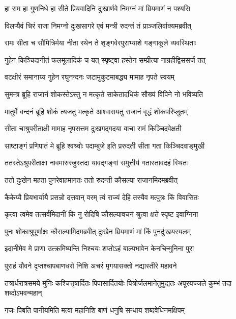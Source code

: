 \twolineshloka
{हा राम हा गुणनिधे हा सीते प्रियवादिनि}
{दुःखार्णवे निमग्नं मां म्रियमाणं न पश्यसि} %

\twolineshloka
{विलप्यैवं चिरं राजा निमग्नो दुःखसागरे}
{एवं मन्त्री रुदन्तं तं प्राञ्जलिर्वाक्यमब्रवीत्} %

\twolineshloka
{रामः सीता च सौमित्रिर्मया नीता रथेन ते}
{शृङ्गवेरपुराभ्याशे गङ्गाकूले व्यवस्थिताः} %

\twolineshloka
{गुहेन किञ्चिदानीतं फलमूलादिकं च यत्}
{स्पृष्ट्वा हस्तेन सम्प्रीत्या नाग्रहीद्विससर्ज तत्} %

\twolineshloka
{वटक्षीरं समानाय्य गुहेन रघुनन्दनः}
{जटामुकुटमाबद्ध्य मामाह नृपते स्वयम्} %

\twolineshloka
{सुमन्त्र ब्रूहि राजानं शोकस्तेऽस्तु न मत्कृते}
{साकेतादधिकं सौख्यं विपिने नो भविष्यति} %

\twolineshloka
{मातुर्मे वन्दनं ब्रूहि शोकं त्यजतु मत्कृते}
{आश्वासयतु राजानं वृद्धं शोकपरिप्लुतम्} %

\twolineshloka
{सीता चाश्रुपरीताक्षी मामाह नृपसत्तम}
{दुःखगद्गदया वाचा रामं किञ्चिदवेक्षती} %

\twolineshloka
{साष्टाङ्गं प्रणिपातं मे ब्रूहि श्वश्र्वोः पदाम्बुजे}
{इति प्ररुदती सीता गता किञ्चिदवाङ्मुखी} %

\twolineshloka
{ततस्तेऽश्रुपरीताक्षा नावमारुरुहुस्तदा}
{यावद्गङ्गां समुत्तीर्य गतास्तावदहं स्थितः} %

\twolineshloka
{ततो दुःखेन महता पुनरेवाहमागतः}
{ततो रुदन्ती कौसल्या राजानमिदमब्रवीत्} %

\twolineshloka
{कैकेय्यै प्रियभार्यायै प्रसन्नो दत्तवान् वरम्}
{त्वं राज्यं देहि तस्यैव मत्पुत्रः किं विवासितः} %

\twolineshloka
{कृत्वा त्वमेव तत्सर्वमिदानीं किं नु रोदिषि}
{कौसल्यावचनं श्रुत्वा क्षते स्पृष्ट इवाग्निना} %

\twolineshloka
{पुनः शोकाश्रुपूर्णाक्षः कौसल्यामिदमब्रवीत्}
{दुःखेन म्रियमाणं मां किं पुनर्दुःखयस्यलम्} %

\twolineshloka
{इदानीमेव मे प्राणा उत्क्रमिष्यन्ति निश्चयः}
{शप्तोऽहं बाल्यभावेन केनचिन्मुनिना पुरा} %

\twolineshloka
{पुराहं यौवने दृप्तश्चापबाणधरो निशि}
{अचरं मृगयासक्तो नद्यास्तीरे महावने} %

\threelineshloka
{तत्रार्धरात्रसमये मुनिः कश्चित्तृषार्दितः}
{पिपासार्दितयोः पित्रोर्जलमानेतुमुद्यतः}
{अपूरयज्जले कुम्भं तदा शब्दोऽभवन्महान्} %

\twolineshloka
{गजः पिबति पानीयमिति मत्वा महानिशि}
{बाणं धनुषि सन्धाय शब्दवेधिनमक्षिपम्} %

